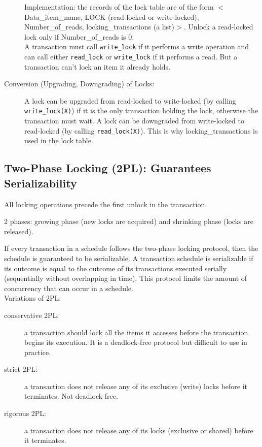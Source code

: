 \begin{description}
    Implementation: the records of the lock table are of the form $<$Data\_item\_name, LOCK (read-locked or write-locked), Number\_of\_reads, locking\_transactions (a list)$>$. Unlock a read-locked lock only if Number\_of\_reads is 0.\\
    
    A transaction must call \texttt{write\_lock} if it performs a write operation and can call either \texttt{read\_lock} or \texttt{write\_lock} if it performs a read. But a transaction can't lock an item it already holds.
    
    \item [Conversion (Upgrading, Downgrading) of Locks:] A lock can be upgraded from read-locked to write-locked (by calling \texttt{write\_lock(X)}) if it is the only transaction holding the lock, otherwise the transaction must wait. A lock can be downgraded from write-locked to read-locked (by calling \texttt{read\_lock(X)}). This is why locking\_transactions is used in the lock table.
\end{description}

\subsection{Two-Phase Locking (2PL): Guarantees Serializability}
All locking operations precede the first unlock in the transaction.

2 phases: growing phase (new locks are acquired) and shrinking phase (locks are released).

If every transaction in a schedule follows the two-phase locking protocol, then the schedule is guaranteed to be serializable. A transaction schedule is serializable if its outcome is equal to the outcome of its transactions executed serially (sequentially without overlapping in time). This protocol limits the amount of concurrency that can occur in a schedule.\\

Variations of 2PL:
\begin{description}
    \item[conservative 2PL:] a transaction should lock all the items it accesses before the transaction begins its execution. It is a deadlock-free protocol but difficult to use in practice.
    \item[strict 2PL:] a transaction does not release any of its exclusive (write) locks before it terminates. Not deadlock-free.
    \item[rigorous 2PL:] a transaction does not release any of its locks (exclusive or shared) before it terminates.
\end{description}

